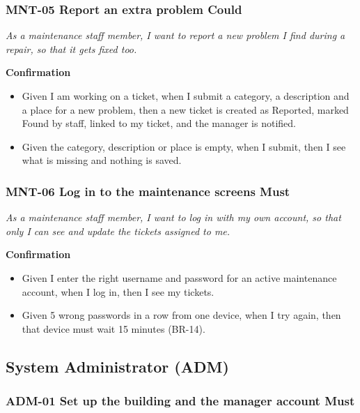 \documentclass[11pt,a4paper]{report}
\begin{document}
\subsubsection*{MNT-05 \textperiodcentered{} Report an extra problem \textperiodcentered{} Could}

\emph{As a maintenance staff member, I want to report a new problem I find during a repair, so that it gets fixed too.}

\medskip\noindent\textbf{Confirmation}\par

\begin{itemize}
  \item Given I am working on a ticket, when I submit a category, a description and a place for a new problem, then a new ticket is created as Reported, marked Found by staff, linked to my ticket, and the manager is notified.
  \item Given the category, description or place is empty, when I submit, then I see what is missing and nothing is saved.
\end{itemize}

\subsubsection*{MNT-06 \textperiodcentered{} Log in to the maintenance screens \textperiodcentered{} Must}

\emph{As a maintenance staff member, I want to log in with my own account, so that only I can see and update the tickets assigned to me.}

\medskip\noindent\textbf{Confirmation}\par

\begin{itemize}
  \item Given I enter the right username and password for an active maintenance account, when I log in, then I see my tickets.
  \item Given 5 wrong passwords in a row from one device, when I try again, then that device must wait 15 minutes (BR-14).
\end{itemize}

\subsection{System Administrator (ADM)}

\subsubsection*{ADM-01 \textperiodcentered{} Set up the building and the manager account \textperiodcentered{} Must}
\end{document}
